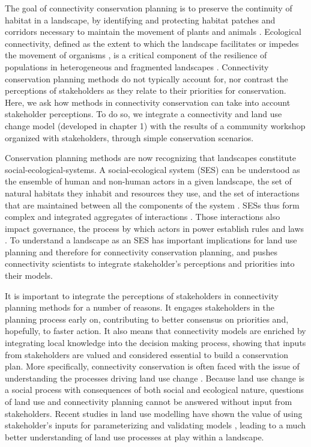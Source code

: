 
The goal of connectivity conservation planning is to preserve the continuity of habitat in a landscape, by identifying and protecting habitat patches and corridors necessary to maintain the movement of plants and animals \citep{keeley_thirty_2019}. Ecological connectivity, defined as the extent to which the landscape facilitates or impedes the movement of organisms \citep{crooks_landscape_2006}, is a critical component of the resilience of populations in heterogeneous and fragmented landscapes \citep{gonzalez_spatial_2017}. Connectivity conservation planning methods do not typically account for, nor contrast the perceptions of stakeholders as they relate to  their priorities for conservation. Here, we ask how methods in connectivity conservation can take into account stakeholder perceptions. To do so, we integrate a connectivity and land use change model (developed in chapter 1) with the results of a community workshop organized with stakeholders, through simple conservation scenarios.

Conservation planning methods are now recognizing that landscapes constitute social-ecological-systems. A social-ecological system (SES) can be understood as the ensemble of human and non-human actors in a given landscape, the set of natural habitats they inhabit and resources they use, and the set of interactions that are maintained between all the components of the system \citep{ostrom_general_2009}. SESs thus form complex and integrated aggregates of interactions \citep{hinkel_enhancing_2014}. Those interactions also impact governance, the process by which actors in power establish rules and laws \citep{bissonnette_comparing_2018}. To understand a landscape as an SES has important implications for land use planning and therefore for connectivity conservation planning, and pushes connectivity scientists to integrate stakeholder’s perceptions and priorities into their models. 

It is important to integrate the perceptions of stakeholders in connectivity planning methods for a number of reasons. It engages stakeholders in the planning process early on, contributing to better consensus on priorities and, hopefully, to faster action. It also means that connectivity models are enriched by integrating local knowledge into the decision making process, showing that inputs from stakeholders are valued and considered essential to build a conservation plan. More specifically, connectivity conservation is often faced with the issue of understanding the processes driving land use change \citep{worboys_connectivity_2010}. Because land use change is a social process with consequences of both social and ecological nature, questions of land use and connectivity planning cannot be answered without input from stakeholders. Recent studies in land use modelling have shown the value of using stakeholder’s inputs for parameterizing and validating models \citep{hewitt_participatory_2014, voinov_modelling_2010}, leading to a much better understanding of land use processes at play within a landscape.

